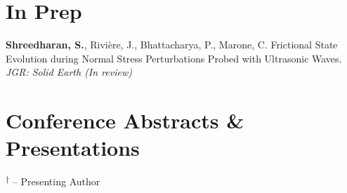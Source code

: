 \documentclass[11pt,letterpaper]{article}
\begin{document}


\section*{In Prep}
\begin{etaremune}
    \item {\bf Shreedharan, S.}, Rivi\`ere, J., Bhattacharya, P., Marone, C. Frictional State Evolution during Normal Stress Perturbations Probed with Ultrasonic Waves. {\em JGR: Solid Earth (In review)}
\end{etaremune}




\section*{Conference Abstracts \& Presentations}
\textsuperscript{$\dagger$} -- Presenting Author
\end{document}
